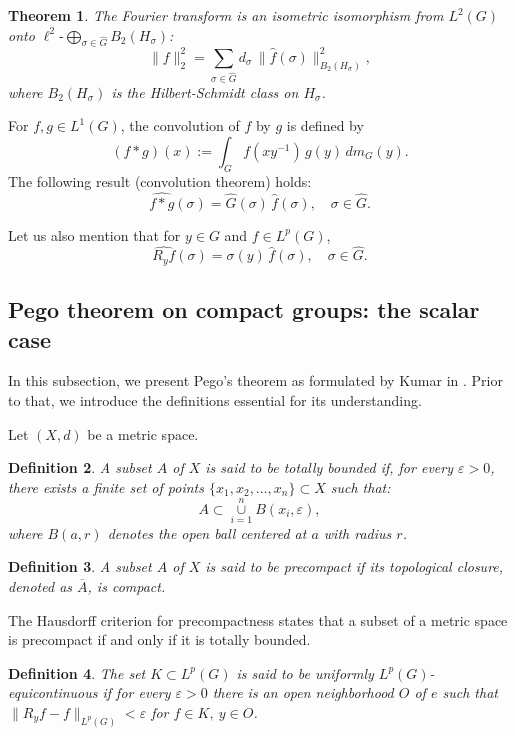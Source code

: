 \documentclass[11pt]{amsart}
\newtheorem{theorem}{Theorem}[section]
\newtheorem{definition}[theorem]{Definition}
\def\union{\mathop{\cup }}
\def\petitoplus{\mathop{\bigoplus}}
\begin{document}
\begin{theorem}\label{scalar:plancherel}
The Fourier transform is an isometric isomorphism from $L^2(G)$ onto
$\ell^2\text{-}\petitoplus\limits_{\sigma\in\widehat{G}}B_2(H_\sigma)$:
$$
\|f\|_2^2=\sum_{\sigma\in\widehat{G}}d_\sigma\,\|\hat f(\sigma)\|_{B_2(H_\sigma)}^2,$$
where $B_2(H_\sigma)$ is the Hilbert-Schmidt class on $H_\sigma$.
\end{theorem}



For $f,g\in L^1(G)$, the convolution of $f$ by $g$ is defined by 
$$
(f*g)(x):=\int_G f(xy^{-1})\,g(y)\,dm_G(y).$$
The following result (convolution theorem) holds:
$$\widehat{f*g}(\sigma)=\widehat{G}(\sigma)\,
\widehat f(\sigma),\quad\sigma\in\widehat{G}.
$$

Let us also mention that for $y\in G$ and $f\in L^p(G)$, 
$$
\widehat{R_yf}(\sigma)=\sigma(y)\,\widehat f(\sigma),\quad\sigma\in\widehat{G}.
$$


\subsection{Pego theorem on compact groups: the scalar case}

In this subsection, we present Pego's theorem as formulated by Kumar in \cite{Kumar2024}. Prior to that, we introduce the definitions essential for its understanding.

Let $(X, d)$ be a metric space.
\begin{definition}
A subset $A$ of $X$ is said to be  {totally bounded} if, for every $\varepsilon > 0$, there exists a finite set of points $\{x_1, x_2, \dots, x_n\} \subset X$ such that:
$$
A \subset \union\limits_{i=1}^{n} B(x_i, \varepsilon),
$$
where $B(a,r)$ denotes the open ball centered at $a$ with radius $r$.
\end{definition}
\begin{definition}
A subset $A$ of $X$ is said to be {precompact} if its topological closure, denoted as $\overline{A}$, is compact.
\end{definition}

\noindent The Hausdorff criterion for precompactness states that a subset of a metric space is precompact if and only if it is totally bounded. 

\begin{definition}
The set $K\subset L^p(G)$ is said to be uniformly $L^p(G)$-equicontinuous if for every
$\varepsilon>0$ there is an open neighborhood $O$ of $e$ such that $\|R_yf-f\|_{L^p(G)}<\varepsilon$
for $f\in K,\ y\in O$.
\end{definition}
\end{document}
